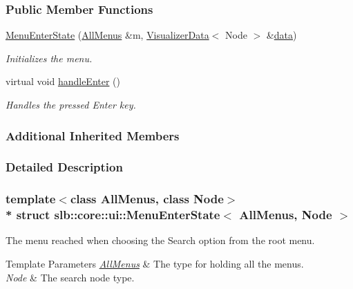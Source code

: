 \subsubsection*{Public Member Functions}
\begin{DoxyCompactItemize}
\item 
\hyperlink{structslb_1_1core_1_1ui_1_1MenuEnterState_acb9388fb87be1d0471a93f796411ad28}{Menu\+Enter\+State} (\hyperlink{structslb_1_1core_1_1ui_1_1AllMenus}{All\+Menus} \&m, \hyperlink{structslb_1_1core_1_1ui_1_1VisualizerData}{Visualizer\+Data}$<$ Node $>$ \&\hyperlink{structslb_1_1core_1_1ui_1_1MenuBase_a475d9457affb2b4fc96737e269d6911f}{data})
\begin{DoxyCompactList}\small\item\em Initializes the menu. \end{DoxyCompactList}\item 
virtual void \hyperlink{structslb_1_1core_1_1ui_1_1MenuEnterState_a3fa97b58426c063084339e56325058a0}{handle\+Enter} ()\hypertarget{structslb_1_1core_1_1ui_1_1MenuEnterState_a3fa97b58426c063084339e56325058a0}{}\label{structslb_1_1core_1_1ui_1_1MenuEnterState_a3fa97b58426c063084339e56325058a0}

\begin{DoxyCompactList}\small\item\em Handles the pressed Enter key. \end{DoxyCompactList}\end{DoxyCompactItemize}
\subsubsection*{Additional Inherited Members}


\subsubsection{Detailed Description}
\subsubsection*{template$<$class All\+Menus, class Node$>$\\*
struct slb\+::core\+::ui\+::\+Menu\+Enter\+State$<$ All\+Menus, Node $>$}

The menu reached when choosing the Search option from the root menu. 


\begin{DoxyTemplParams}{Template Parameters}
{\em \hyperlink{structslb_1_1core_1_1ui_1_1AllMenus}{All\+Menus}} & The type for holding all the menus. \\
\hline
{\em Node} & The search node type. \\
\hline
\end{DoxyTemplParams}


